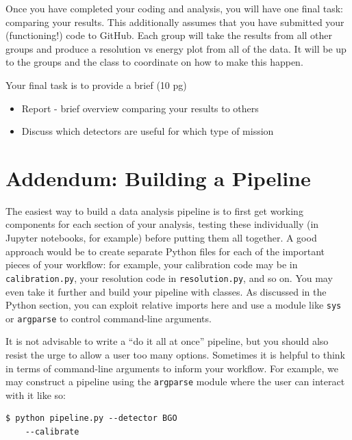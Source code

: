 \documentclass{tufte-book}
\begin{document}
Once you have completed your coding and analysis, you will have one final task: comparing your results. This additionally assumes that you have submitted your (functioning!) code to GitHub. Each group will take the results from all other groups and produce a resolution vs energy plot from all of the data. It will be up to the groups and the class to coordinate on how to make this happen.

\begin{tcolorbox}[sharp corners=all, colback=white!75!green, title=Primary Summary]
Your final task is to provide a brief (10 pg)
\begin{itemize}
\item Report - brief overview comparing your results to others
\item Discuss which detectors are useful for which type of mission
\end{itemize}
\end{tcolorbox} 


\section{Addendum: Building a Pipeline}
\label{sec:he-addendum}

The easiest way to build a data analysis pipeline is to first get working components for each section of your analysis, testing these individually (in Jupyter notebooks, for example) before putting them all together. A good approach would be to create separate Python files for each of the important pieces of your workflow: for example, your calibration code may be in \verb|calibration.py|, your resolution code in \verb|resolution.py|, and so on. You may even take it further and build your pipeline with classes. As discussed in the Python section, you can exploit {relative imports} here and use a module like \verb|sys| or \verb|argparse| to control command-line arguments.

It is not advisable to write a ``do it all at once'' pipeline, but you should also resist the urge to allow a user too many options. Sometimes it is helpful to think in terms of command-line arguments to inform your workflow. For example, we may construct a pipeline using the \verb|argparse| module where the user can interact with it like so:

\begin{lstlisting}[backgroundcolor={\color{lightgray}}, breaklines=true]
$ python pipeline.py --detector BGO
    --calibrate
\end{lstlisting}
\end{document}
